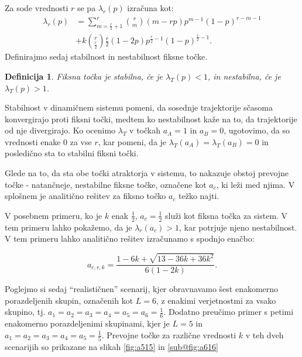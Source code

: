 \documentclass[a4paper,12pt]{article}
\newtheorem{definicija}{Definicija}}
\newcommand{\lam}[1]{\lambda_{#1}(p)}
\begin{document}
Za sode vrednosti $r$ se pa $\lam{r}$ izračuna kot: 
    \begin{align} \label{eq:fp2}
        \lambda_r(p) & = \sum_{m=\frac{r}{2} + 1}^r \binom{r}{m} (m-rp) p^{m-1} (1-p)^{r-m-1} \\ \nonumber
        & + k \binom{r}{\frac{r}{2}} \frac{r}{2} (1-2p) p^{\frac{r}{2}-1} (1-p)^{\frac{r}{2}-1}. 
    \end{align}
Definirajmo sedaj stabilnost in nestabilnost fiksne točke. 
\begin{definicija}
    Fiksna točka je stabilna, če je $\lambda_T(p) < 1$, in nestabilna, če je $\lambda_T(p) > 1$. 
\end{definicija}
Stabilnost v dinamičnem sistemu pomeni, da sosednje trajektorije sčasoma konvergirajo proti fiksni točki, medtem ko nestabilnost kaže na to, da trajektorije od nje divergirajo. Ko ocenimo $\lambda_T$ v točkah $a_A = 1$ in $a_B = 0$, ugotovimo, da so vrednosti enake 0 za vse $r$, kar pomeni, da je $\lambda_T(a_A) = \lambda_T(a_B) = 0$ in posledično sta to stabilni fiksni točki.

Glede na to, da sta obe točki atraktorja v sistemu, to nakazuje obstoj prevojne točke - natančneje, nestabilne fiksne točke, označene kot $a_c$, ki leži med njima. V splošnem je analitično rešitev za fiksno točko $a_c$ težko najti.

V posebnem primeru, ko je $k$ enak $\frac{1}{2}$, $a_c = \frac{1}{2}$ služi kot fiksna točka za sistem. V tem primeru lahko pokažemo, da je $\lambda_r(a_c) > 1$, kar potrjuje njeno nestabilnost.
V tem primeru lahko analitično rešitev izračunamo s spodnjo enačbo:

\begin{equation}
    a_{c, r, k} = \frac{1-6k+\sqrt{13-36k+36k^2}}{6(1-2k)}.    
    \label{eq:fp4}
\end{equation}

Poglejmo si sedaj ``realističnen'' scenarij, kjer obravnavamo šest enakomerno porazdeljenih skupin, 
označenih kot $L=6$, z enakimi verjetnostmi za vsako skupino, tj. $a_1 = a_2 = a_3 = a_4 = a_5 = a_6 = \frac{1}{6}$. 
Dodatno preučimo primer s petimi enakomerno porazdeljenimi skupinami, kjer je $L=5$ in $a_1 = a_2 = a_3 = a_4 = a_5 = \frac{1}{5}$. 
Prevojne točke za različne vrednosti $k$ v teh dveh scenarijih so prikazane na slikah \ref{fig:a515} in \ref{sub@fig:a616}
\end{document}
